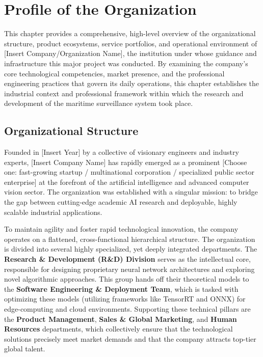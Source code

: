 \chapter{Profile of the Organization}

This chapter provides a comprehensive, high-level overview of the organizational structure, product ecosystems, service portfolios, and operational environment of [Insert Company/Organization Name], the institution under whose guidance and infrastructure this major project was conducted. By examining the company's core technological competencies, market presence, and the professional engineering practices that govern its daily operations, this chapter establishes the industrial context and professional framework within which the research and development of the maritime surveillance system took place.

\section{Organizational Structure}
Founded in [Insert Year] by a collective of visionary engineers and industry experts, [Insert Company Name] has rapidly emerged as a prominent [Choose one: fast-growing startup / multinational corporation / specialized public sector enterprise] at the forefront of the artificial intelligence and advanced computer vision sector. The organization was established with a singular mission: to bridge the gap between cutting-edge academic AI research and deployable, highly scalable industrial applications. 

To maintain agility and foster rapid technological innovation, the company operates on a flattened, cross-functional hierarchical structure. The organization is divided into several highly specialized, yet deeply integrated departments. The \textbf{Research \& Development (R\&D) Division} serves as the intellectual core, responsible for designing proprietary neural network architectures and exploring novel algorithmic approaches. This group hands off their theoretical models to the \textbf{Software Engineering \& Deployment Team}, which is tasked with optimizing these models (utilizing frameworks like TensorRT and ONNX) for edge-computing and cloud environments. Supporting these technical pillars are the \textbf{Product Management}, \textbf{Sales \& Global Marketing}, and \textbf{Human Resources} departments, which collectively ensure that the technological solutions precisely meet market demands and that the company attracts top-tier global talent.

